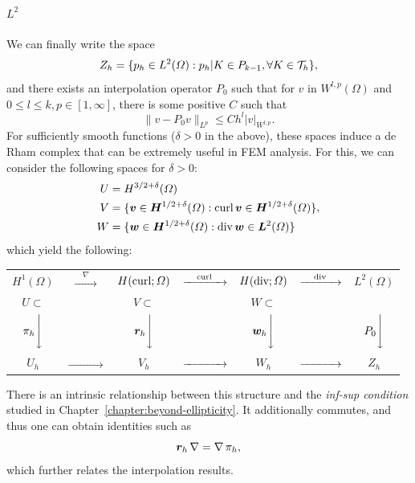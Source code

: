 \paragraph{\texorpdfstring{$L^2$}{L2}} We can finally write the space 
\begin{equation}
    Z_h = \{ p_h \in L^2(\Omega): p_h|K \in P_{k-1}, \forall K\in \mathcal{T}_h\},
\end{equation}
and there exists an interpolation operator $P_0$ such that for $v$ in $W^{l,p}(\Omega)$ and $0\leq l \leq k, p\in[1,\infty]$, there is some positive $C$ such that
\begin{equation}
    \| v - P_0v\|_{L^p} \leq C h^l |v|_{W^{l,p}}.
\end{equation}
For sufficiently smooth functions ($\delta>0$ in the above), these spaces induce a de Rham complex that can be extremely useful in FEM analysis. For this, we can consider the following spaces for $\delta > 0$: 
\begin{equation}
    \begin{aligned}
        U &= H^{3/2+\delta}(\Omega) \\
        V &= \{\vec v \in \vec H^{1/2+\delta}(\Omega) : \curl \vec v \in \vec H^{1/2+\delta}(\Omega)\} \\
        W &= \{ \vec w \in \vec H^{1/2+\delta}(\Omega): \dive \vec w \in \vec L^2(\Omega) \}
    \end{aligned},
\end{equation}
which yield the following: 
\begin{center} 
    \begin{tabular}{ccccccc}
    $H^1(\Omega)$ & $\xrightarrow{\quad\nabla\quad}$& $H(\operatorname{\text{curl}};\Omega)$ & $\xrightarrow{\quad\operatorname{\text{curl}}\quad}$ & $H(\operatorname{\text{div}};\Omega)$ & $\xrightarrow{\quad\operatorname{\text{div}}\quad} $ & $L^2(\Omega)$ \\
    $U\subset$ & & $V\subset$ & & $W \subset$ & &  \\
    $\pi_h \Bigg\downarrow$ && $\vec r_h \Bigg\downarrow$ && $\vec w_h\Bigg\downarrow$ && $P_0 \Bigg\downarrow$ \\
    $U_h$ & $\xrightarrow{\quad\phantom{nabla}\quad}$& $V_h$ & $\xrightarrow{\quad\phantom{\curl}\quad}$ & $W_h$ & $\xrightarrow{\quad\phantom{\dive}\quad} $ & $Z_h$ \\
    \end{tabular}
\end{center} 
There is an intrinsic relationship between this structure and the \emph{inf-sup condition} studied in Chapter~\ref{chapter:beyond-ellipticity}. It additionally commutes, and thus one can obtain identities such as 
\begin{equation*}
\vec r_h \grad = \grad \pi_h,
\end{equation*}
which further relates the interpolation results. 


